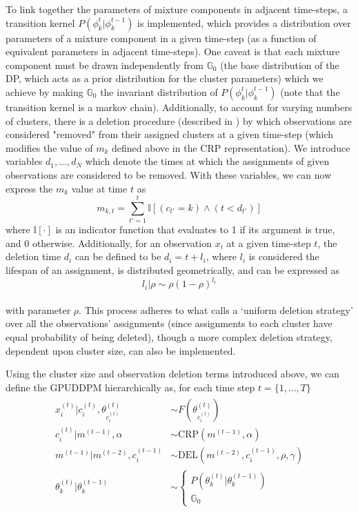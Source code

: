 \documentclass{article}
\begin{document}
To link together the parameters of mixture components in adjacent time-steps, a transition kernel $P(\phi_{k}^{t} | \phi_{k}^{t-1})$ is implemented, which provides a distribution over parameters of a mixture component in a given time-step (as a function of equivalent parameters in adjacent time-steps). One caveat is that each mixture component must be drawn independently from $\mathbb{G}_{0}$ (the base distribution of the DP, which acts as a prior distribution for the cluster parameters) which we achieve by making $\mathbb{G}_{0}$ the invariant distribution of $P(\phi_{k}^{t} | \phi_{k}^{t-1})$ (note that the transition kernel is a markov chain). Additionally, to account for varying numbers of clusters, there is a deletion procedure (described in \cite{caron_2007}) by which observations are considered "removed" from their assigned clusters at a given time-step (which modifies the value of $m_{k}$ defined above in the CRP representation). We introduce variables $d_{1}, \ldots, d_{N}$ which denote the times at which the assignments of given observations are considered to be removed. With these variables, we can now express the $m_{k}$ value at time $t$ as
\begin{equation}
m_{k,t} = \sum_{t' = 1}^{t} \mathbb{I}[(c_{t'}=k) \wedge (t < d_{t'})]
\end{equation}
where $\mathbb{I}[\cdot]$ is an indicator function that evaluates to 1 if its argument is true, and 0 otherwise. Additionally, for an observation $x_{i}$ at a given time-step $t$, the deletion time $d_{i}$ can be defined to be $d_{i} = t + l_{i}$, where $l_{i}$ is considered the lifespan of an assignment, is distributed geometrically, and can be expressed as
\begin{equation}
l_{i} | \rho  \sim  \rho(1 - \rho)^{l_{i}}
\end{equation} \\
with parameter $\rho$. This process adheres to what \cite{caron_2007} calls a `uniform deletion strategy' over all the observations' assignments (since assignments to each cluster have equal probability of being deleted), though a more complex deletion strategy, dependent upon cluster size, can also be implemented.

Using the cluster size and observation deletion terms introduced above, we can define the GPUDDPM hierarchically as, for each time step $t = \{1, \ldots, T\}$
\begin{align}
\begin{split}
	x_{i}^{(t)} | c_{i}^{(t)}, \theta_{c_{i}^{(t)}}^{(t)} &\sim F(\theta_{c_{i}^{(t)}}^{(t)}) \\
	c_{i}^{(t)} | m^{(t-1)}, \alpha  &\sim  \text{CRP}(m^{(t-1)}, \alpha) \\
	m^{(t-1)} | m^{(t-2)}, c_{i}^{(t-1)}  &\sim \text{DEL}(m^{(t-2)}, c_{i}^{(t-1)}, \rho, \gamma) \\
	\theta_{k}^{(t)} | \theta_{k}^{(t-1)}   &\sim 
											\begin{cases}
											P(\theta_{k}^{(t)} | \theta_{k}^{(t-1)}) \\
											\mathbb{G}_{0}
											\end {cases}
\end{split}
\end{align}
\end{document}
